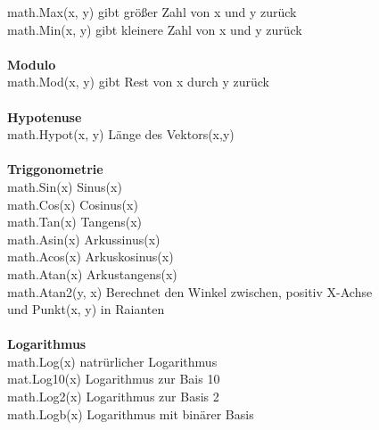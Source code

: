 \documentclass[twoside,a4paper,12pt]{article}
\begin{document}
\begin{tabbing}
 \> math.Max(x, y)\> gibt größer Zahl von x und y zurück \\ 
 \> math.Min(x, y)\> gibt kleinere Zahl von x und y zurück \\ 
 \> \\
 \> \textbf{Modulo} \\ 
 \> math.Mod(x, y)\> gibt Rest von x durch y zurück \\ 
 \> \\
 \> \textbf{Hypotenuse} \\ 
 \> math.Hypot(x, y)\> Länge des Vektors(x,y) \\ 
 \> \\
 \> \textbf{Triggonometrie} \\ 
 \> math.Sin(x)\> Sinus(x) \\ 
 \> math.Cos(x)\> Cosinus(x) \\ 
 \> math.Tan(x)\> Tangens(x) \\
 \> math.Asin(x)\> Arkussinus(x) \\ 
 \> math.Acos(x)\> Arkuskosinus(x) \\ 
 \> math.Atan(x)\> Arkustangens(x) \\
 \> math.Atan2(y, x)\> Berechnet den Winkel zwischen, positiv X-Achse \\ 
 \> \> und Punkt(x, y) in Raianten \\
 \> \\
 \> \textbf{Logarithmus} \\ 
 \> math.Log(x)\> natrürlicher Logarithmus \\
 \> mat.Log10(x)\> Logarithmus zur Bais 10 \\ 
 \> math.Log2(x)\> Logarithmus zur Basis 2 \\ 
 \> math.Logb(x)\> Logarithmus mit binärer Basis \\ 
\end{tabbing}
\end{document}
